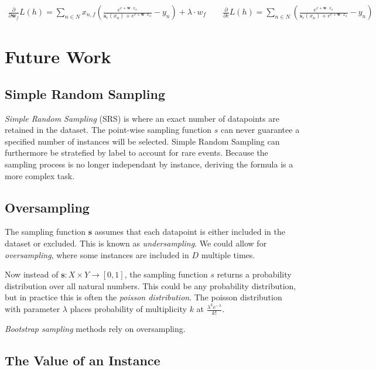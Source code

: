 \documentclass[twoside]{article}
\begin{document}
\begin{align}
\frac{\partial}{\partial \mathbf{w}_f }L(h)=\sum_{n \in  N} x_{n,f}\left(\frac{e^{c+\mathbf{w} \cdot x_n}}{\mathbf{s}_r(x_n)+e^{c+\mathbf{w} \cdot x_n}} -y_n  \right )+ \lambda \cdot w_f
\qquad \frac{\partial}{\partial c}L(h)=\sum_{n \in  N} \left(\frac{e^{c+\mathbf{w} \cdot x_n}}{\mathbf{s}_r(x_n)+e^{c+\mathbf{w} \cdot x_n}}  -y_n\right )
\end{align}

\section{Future Work}
\label{section:future_work}

\subsection{Simple Random Sampling}

\textit{Simple Random Sampling} (SRS) is where an exact number of datapoints are retained in the dataset. The point-wise sampling function \(s\) can never guarantee a specified number of instances will be selected. Simple Random Sampling can furthermore be stratefied by label to account for rare events. Because the sampling process is no longer independant by instance, deriving the formula is a more complex task.

\subsection{Oversampling}

The sampling function \(\mathbf{s}\) assumes that each datapoint is either included in the dataset or excluded. This is known as \textit{undersampling}. We could allow for \textit{oversampling}, where some instances are included in \(D\) multiple times.

Now instead of \(\mathbf{s}: X \times Y \rightarrow \left [ 0, 1\right ]\), the sampling function \(s\) returns a probability distribution over all natural numbers. This could be any probability distribution, but in practice this is often the \textit{poisson distribution}. The poisson distribution with parameter \(\lambda\) places probability of multiplicity \(k\) at \(\frac{\lambda^k e^{-\lambda}}{k!}\).

\textit{Bootstrap sampling} methods rely on oversampling.

\subsection{The Value of an Instance}
\end{document}
